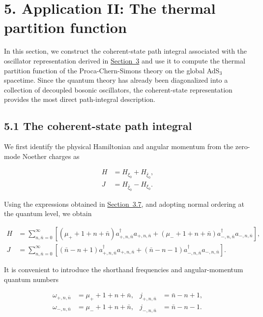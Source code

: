 \section{5. Application II: The thermal partition function}\label{sec:thermal-partition-function}

In this section, we construct the coherent-state path integral associated with the oscillator representation derived in \hyperref[sec:quantization]{Section~3} and use it to compute the thermal partition function of the Proca-Chern-Simons theory on the global AdS$_3$ spacetime. Since the quantum theory has already been diagonalized into a collection of decoupled bosonic oscillators, the coherent-state representation provides the most direct path-integral description.

\subsection{5.1 The coherent-state path integral}\label{subsec:coherent-state-path-integral}

We first identify the physical Hamiltonian and angular momentum from the zero-mode Noether charges as

\begin{align}
H & =H_{\xi _{0}}+H_{\bar{\xi}_{0}}, \\
J & =H_{\bar{\xi}_{0}}-H_{\xi _{0}}.
\end{align}

Using the expressions obtained in \hyperref[subsec:noether-charges-killing]{Section~3.7}, and adopting normal ordering at the quantum level, we obtain

\begin{align}
H & =\sum ^{\infty}_{n,\bar{n}=0}\left[(\mu _{+}+1+n+\bar{n})a^{\dagger}_{+,n,\bar{n}}a_{+,n,\bar{n}}+(\mu _{-}+1+n+\bar{n})a^{\dagger}_{-,n,\bar{n}}a_{-,n,\bar{n}}\right], \\
J & =\sum ^{\infty}_{n,\bar{n}=0}\left[(\bar{n}-n+1)a^{\dagger}_{+,n,\bar{n}}a_{+,n,\bar{n}}+(\bar{n}-n-1)a^{\dagger}_{-,n,\bar{n}}a_{-,n,\bar{n}}\right].
\end{align}

It is convenient to introduce the shorthand frequencies and angular-momentum quantum numbers

\begin{align}
\omega _{+,n,\bar{n}} & =\mu _{+}+1+n+\bar{n}, & j_{+,n,\bar{n}} & =\bar{n}-n+1, \\
\omega _{-,n,\bar{n}} & =\mu _{-}+1+n+\bar{n}, & j_{-,n,\bar{n}} & =\bar{n}-n-1.
\end{align}

